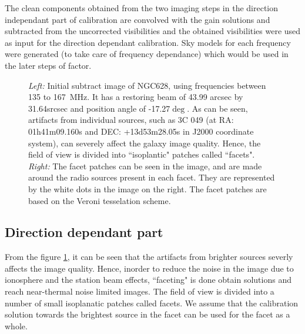 \documentclass[../main/thesis_msc.tex]{subfiles}
\begin{document}
The clean components obtained from the two imaging steps in the direction independant part of calibration are convolved with the gain solutions and subtracted from the uncorrected visibilities and the obtained visibilities were used as input for the direction dependant calibration. Sky models for each frequency were generated (to take care of frequency dependance) which would be used in the later steps of factor.

\begin{figure}[h]
	\centering
	\caption{\textit{Left:} Initial subtract image of NGC628, using frequencies between 135 to 167~MHz. It has a restoring beam of 43.99 arcsec by 31.64srcsec and position angle of -17.27$\deg$. As can be seen, artifacts from individual sources, such as 3C 049 (at RA: 01h41m09.160s and DEC: +13d53m28.05s in J2000 coordinate system), can severely affect the galaxy image quality. Hence, the field of view is divided into ``isoplantic" patches called ``facets". \textit{Right:} The facet patches can be seen in the image, and are made around the radio sources present in each facet. They are represented by the white dots in the image on the right. The facet patches are based on the Veroni tesselation scheme.}
	\label{faceting}
	\end{figure}
	
\subsection{Direction dependant part}

From the figure \ref{faceting}, it can be seen that the artifacts from brighter sources severly affects the image quality. Hence, inorder to reduce the noise in the image due to ionosphere and the station beam effects, ``faceting" is done obtain solutions and reach near-thermal noise limited images. The field of view is divided into a number of small isoplanatic patches called facets. We assume that the calibration solution towards the brightest source in the facet can be used for the facet as a whole.  \\
\end{document}
